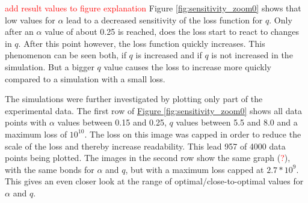 \textcolor{red}{add result values to figure explanation}
Figure \ref*{fig:sensitivity_zoom0} shows that low values for $\alpha$ lead to a decreased sensitivity of the loss function
for $q$. Only after an $\alpha$ value of about 0.25 is reached, does the loss start to react to changes in $q$. After this point
however, the loss function quickly increases. This phenomenon can be seen both, if $q$ is increased and if $q$ is not increased
in the simulation. But a bigger $q$ value causes the loss to increase more quickly compared to a simulation with a small loss.



The simulations were further investigated by plotting only part of the experimental data.
The first row of \hyperref[fig:sensitivity_zoom0]{Figure \ref*{fig:sensitivity_zoom0}} shows all data points with $\alpha$ values between 0.15
and 0.25, $q$ values between 5.5 and 8.0 and a maximum loss of $10^{10}$. The loss on this image was capped in order to reduce
the scale of the loss and thereby increase readability. This lead 957 of 4000 data points being plotted. The images in the
second row show the same graph (\textcolor{red}{?}), with the same bonds for $\alpha$ and $q$, but with a maximum loss capped
at $2.7*10^{9}$. This gives an even closer look at the range of optimal/close-to-optimal values for $\alpha$ and $q$.

